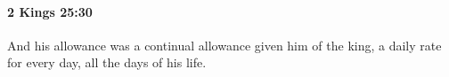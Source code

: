 		\paragraph{2 Kings 25:30} %
			\label{2KINGS-25-30}

			And his allowance was a continual allowance given him of the king, a daily rate for every day, all the days of his life.

